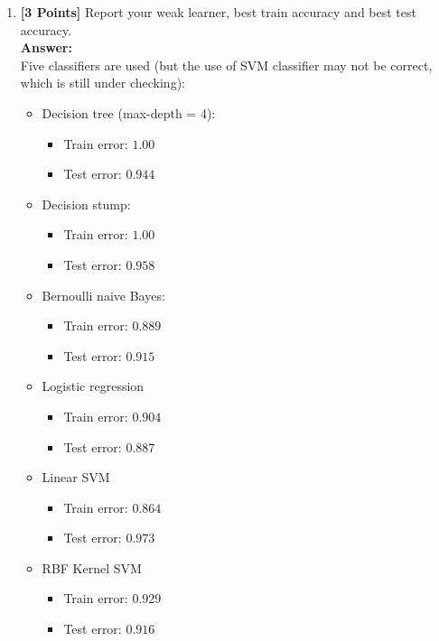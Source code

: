 \documentclass{article}
\begin{document}
\begin{enumerate}
	\item \textbf{[3 Points]} Report your weak learner, best train accuracy and best test accuracy.\\
	\textbf{Answer:}\\
	Five classifiers are used (but the use of SVM classifier may not be correct, which is still under checking):
	\begin{itemize}
		\item Decision tree (max-depth = 4):
		\begin{itemize}
			\item Train error: $1.00$
			\item Test error: $0.944$
		\end{itemize}
		\item Decision stump:
		\begin{itemize}
			\item Train error: $1.00$
			\item Test error: $0.958$
		\end{itemize}
		\item Bernoulli naive Bayes:
		\begin{itemize}
			\item Train error: $0.889$
			\item Test error: $0.915$
		\end{itemize}
		\item Logistic regression
		\begin{itemize}
			\item Train error: $0.904$
			\item Test error: $0.887$
		\end{itemize}
		\item Linear SVM
		\begin{itemize}
			\item Train error: $0.864$
			\item Test error: $0.973$
		\end{itemize}
		\item RBF Kernel SVM
		\begin{itemize}
			\item Train error: $0.929$
			\item Test error: $0.916$
		\end{itemize}
	\end{itemize}
	

\end{enumerate}
\end{document}
